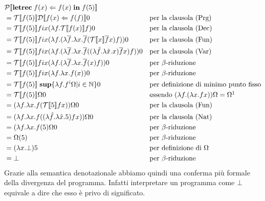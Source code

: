     \begin{align*}
        &\mathcal{P}\llbracket\mbox{\textbf{letrec}}\; f(x) \Leftarrow f(x)\; \mbox{\textbf{in}}\; f(5)\rrbracket &&\\
        &= \mathcal{T}\llbracket f(5)\rrbracket\mathcal{D}\llbracket f(x)\Leftarrow f(f)\rrbracket 0 &&\mbox{per la clausola (Prg)}\\
        &= \mathcal{T}\llbracket f(5)\rrbracket fix(\lambda f.\mathcal{T}\llbracket f(x)\rrbracket f)0 &&\mbox{per la clausola (Dec)}\\
        &= \mathcal{T}\llbracket f(5)\rrbracket fix(\lambda f. (\lambda \overline{f}.\lambda x. \overline{f}(\mathcal{T}\llbracket x\rrbracket\overline{f}x)f))0 &&\mbox{per la clausola (Fun)}\\
        &= \mathcal{T}\llbracket f(5)\rrbracket fix(\lambda f. (\lambda \overline{f}.\lambda x. \overline{f}((\lambda\hat{f}.\lambda \hat{x}.x)\overline{f}x)f))0 &&\mbox{per la clausola (Var)}\\
        &= \mathcal{T}\llbracket f(5)\rrbracket fix(\lambda f. (\lambda \overline{f}.\lambda x. \overline{f}(x)f))0 &&\mbox{per $\beta$-riduzione}\\
        &= \mathcal{T}\llbracket f(5)\rrbracket fix(\lambda f.\lambda x.f(x))0 &&\mbox{per $\beta$-riduzione}\\
        &= \mathcal{T}\llbracket f(5)\rrbracket\; \mbox{\textbf{sup}}\{\lambda f.f^i\Omega |i\in\mathbb{N}\}0 &&\mbox{per definizione di minimo punto fisso}\\
        &= \mathcal{T}\llbracket f(5)\rrbracket\Omega 0 &&\mbox{essendo $(\lambda f.(\lambda x.fx))\Omega = \Omega$}\footnotemark\\
        &= (\lambda f.\lambda x. f(\mathcal{T}\llbracket 5\rrbracket fx))\Omega 0 &&\mbox{per la clausola (Fun)}\\
        &= (\lambda f.\lambda x. f((\lambda\hat{f}.\lambda\hat{x}.5) fx))\Omega 0 &&\mbox{per la clausola (Nat)}\\
        &= (\lambda f.\lambda x. f(5)\Omega 0 &&\mbox{per $\beta$-riduzione}\\
        &= \Omega(5) &&\mbox{per $\beta$-riduzione}\\
        &= (\lambda x.\bot)5 &&\mbox{per definizione di $\Omega$}\\
        &= \bot &&\mbox{per $\beta$-riduzione}
    \end{align*}
    Grazie alla semantica denotazionale abbiamo quindi una conferma più formale della divergenza del programma. Infatti interpretare un programma come $\bot$ equivale a dire che esso è privo di significato.
